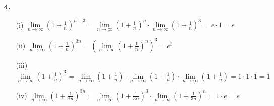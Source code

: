 \documentclass[a4paper,11pt]{scrartcl}
\newcommand{\bra}[1]{\left(#1\right)}
\newcommand{\limn}[1]{\lim\limits_{n \rightarrow \infty}\bra{#1}}
\begin{document}
\begin{enumerate}
    \item[\textbf{4.}]
        \begin{enumerate}
            \item[(i)]
                $\displaystyle
                \limn{1 + \frac{1}{n}}^{n+3}
                = \limn{1 + \frac{1}{n}}^n \cdot \limn{1 + \frac{1}{n}}^3
                = e \cdot 1 = e
                $

            \item[(ii)]
                $\displaystyle
                \limn{1 + \frac{1}{n}}^{3n}
                = \bra{\limn{1 + \frac{1}{n}}^n}^3
                = e^3
                $

            \item[(iii)]
                $\displaystyle
                \limn{1 + \frac{1}{n}}^3
                = \limn{1 + \frac{1}{n}} \cdot \limn{1 + \frac{1}{n}} \cdot \limn{1 + \frac{1}{n}}
                = 1 \cdot 1 \cdot 1
                = 1
                $

            \item[(iv)]
                $\displaystyle
                \limn{1 + \frac{1}{3n}}^{3n}
                = \limn{1 + \frac{1}{3n}}^3 \cdot \limn{1 + \frac{1}{3n}}^n
                = 1 \cdot e = e
                $
        \end{enumerate}
\end{enumerate}
\end{document}
